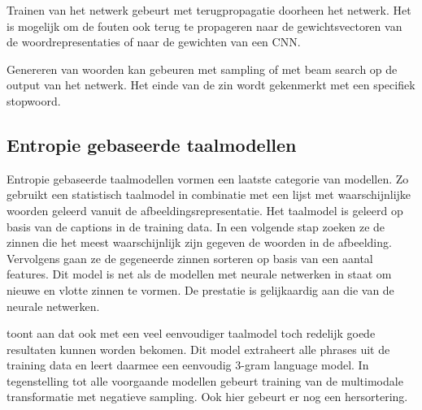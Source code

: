Trainen van het netwerk gebeurt met terugpropagatie doorheen het netwerk. Het is mogelijk om de fouten ook terug te propageren naar de gewichtsvectoren van de woordrepresentaties of naar de gewichten van een CNN.

Genereren van woorden kan gebeuren met sampling of met beam search op de output van het netwerk. Het einde van de zin wordt gekenmerkt met een specifiek stopwoord.

\subsection{Entropie gebaseerde taalmodellen}
Entropie gebaseerde taalmodellen vormen een laatste categorie van modellen. Zo gebruikt \cite{Fang} een statistisch taalmodel in combinatie met een lijst met waarschijnlijke woorden geleerd vanuit de afbeeldingsrepresentatie. Het taalmodel is geleerd op basis van de captions in de training data. In een volgende stap zoeken ze de zinnen die het meest waarschijnlijk zijn gegeven de woorden in de afbeelding. Vervolgens gaan ze de gegeneerde zinnen sorteren op basis van een aantal features. Dit model is net als de modellen met neurale netwerken in staat om nieuwe en vlotte zinnen te vormen. De prestatie is gelijkaardig aan die van de neurale netwerken.

\cite{Lebret} toont aan dat ook met een veel eenvoudiger taalmodel toch redelijk goede resultaten kunnen worden bekomen. Dit model extraheert alle phrases uit de training data en leert daarmee een eenvoudig 3-gram language model. In tegenstelling tot alle voorgaande modellen gebeurt training van de multimodale transformatie met negatieve sampling. Ook hier gebeurt er nog een hersortering.

